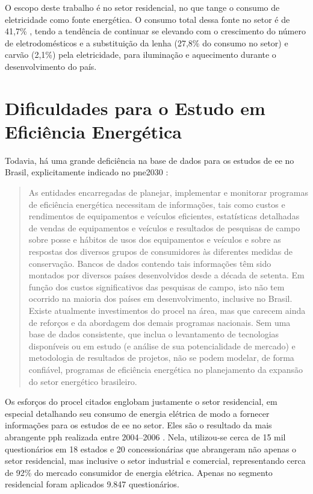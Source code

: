 O escopo deste trabalho é no setor residencial, no que tange o consumo
de eletricidade como fonte energética. O consumo total dessa fonte no
setor é de 41,7\% \cite{ben2012}, tendo a tendência de continuar se
elevando com o crescimento do número de eletrodomésticos e a
substituição da lenha (27,8\% do consumo no setor) e carvão (2,1\%)
pela eletricidade, para iluminação e aquecimento durante o
desenvolvimento do país. 

\section{Dificuldades para o Estudo em Eficiência Energética}
\label{sec:ee_dificuldades}

Todavia, há uma grande deficiência na base de dados para os estudos de
\gls{ee} no Brasil, explicitamente indicado no \gls{pne2030}
\cite[p.~232]{pne30_eff_energ}:

\begin{quote}
As entidades encarregadas de planejar, implementar e monitorar
programas de eficiência energética necessitam de informações, tais
como custos e rendimentos de equipamentos e veículos eficientes,
estatísticas detalhadas de vendas de equipamentos e veículos e
resultados de pesquisas de campo sobre posse e hábitos de usos dos
equipamentos e veículos e sobre as respostas dos diversos grupos de
consumidores às diferentes medidas de conservação. Bancos de dados
contendo tais informações têm sido montados por diversos países
desenvolvidos desde a década de setenta. Em função dos custos
significativos das pesquisas de campo, isto não tem ocorrido na
maioria dos países em desenvolvimento, inclusive no Brasil. Existe
atualmente investimentos do \gls{procel} na área, mas que carecem
ainda de reforços e da abordagem dos demais programas nacionais. Sem
uma base de dados consistente, que inclua o levantamento de
tecnologias disponíveis ou em estudo (e análise de sua potencialidade
de mercado) e metodologia de resultados de projetos, não se podem
modelar, de forma confiável, programas de eficiência energética no
planejamento da expansão do setor energético brasileiro.
\end{quote}

Os esforços do \gls{procel} citados englobam justamente o setor
residencial, em especial detalhando seu consumo de energia elétrica de
modo a fornecer informações para os estudos de \gls{ee} no setor. Eles
são o resultado da mais abrangente \gls{pph} realizada entre
2004--2006 \cite{result_procel_2005,site_pesquisas_procel}.  Nela,
utilizou-se cerca de 15 mil questionários em 18 estados e 20
concessionárias que abrangeram não apenas o setor residencial, mas
inclusive o setor industrial e comercial, representando cerca de 92\%
do mercado consumidor de energia elétrica.  Apenas no segmento
residencial foram aplicados 9.847 questionários.  

